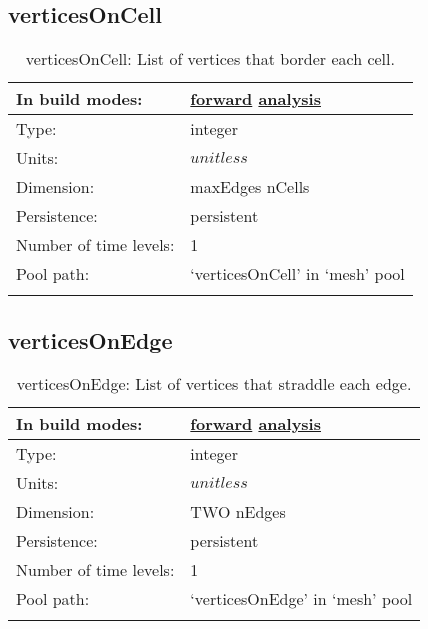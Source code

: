 \subsection[verticesOnCell]{verticesOnCell}
\label{subsec:var_sec_mesh_verticesOnCell}
\begin{center}
\begin{longtable}{| p{2.0in} | p{4.0in} |}
        \hline 
        In build modes: & \hyperref[subsec:forward_var_tab_mesh]{forward} \hyperref[subsec:analysis_var_tab_mesh]{analysis} \\
        \hline 
        Type: & integer \\
        \hline 
        Units: & $unitless$ \\
        \hline 
        Dimension: & maxEdges nCells \\
        \hline 
        Persistence: & persistent \\
        \hline 
        Number of time levels: & 1 \\
        \hline 
            Pool path: & `verticesOnCell' in `mesh' pool \\
		 \hline 
    \caption{verticesOnCell: List of vertices that border each cell.}
\end{longtable}
\end{center}
\subsection[verticesOnEdge]{verticesOnEdge}
\label{subsec:var_sec_mesh_verticesOnEdge}
\begin{center}
\begin{longtable}{| p{2.0in} | p{4.0in} |}
        \hline 
        In build modes: & \hyperref[subsec:forward_var_tab_mesh]{forward} \hyperref[subsec:analysis_var_tab_mesh]{analysis} \\
        \hline 
        Type: & integer \\
        \hline 
        Units: & $unitless$ \\
        \hline 
        Dimension: & TWO nEdges \\
        \hline 
        Persistence: & persistent \\
        \hline 
        Number of time levels: & 1 \\
        \hline 
            Pool path: & `verticesOnEdge' in `mesh' pool \\
		 \hline 
    \caption{verticesOnEdge: List of vertices that straddle each edge.}
\end{longtable}
\end{center}

